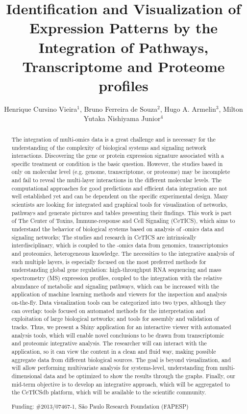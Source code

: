 \documentclass[twoside]{article}
\title{\vspace{-15mm}\fontsize{24pt}{10pt}\selectfont\textbf{Identification and Visualization of Expression Patterns by the Integration of Pathways, Transcriptome and Proteome profiles}} %
\author{Henrique Cursino Vieira$^1$, Bruno Ferreira de Souza$^2$, Hugo A. Armelin$^3$, Milton Yutaka Nishiyama Junior$^4$}
\affil{1 LECC-CETICS, INSTITUTO BUTANTAN\\ 2 ECC-CETICS, INSTITUTO BUTANTAN\\ 3 INSTITUTO BUTANTAN\\ 4 LETA-CETICS, INSTITUTO BUTANTAN\\ }
\date{}
\begin{document}
\maketitle %

\thispagestyle{fancy} %


\begin{abstract}
The integration of multi-omics data is a great challenge and is necessary for the understanding of the complexity of biological systems and signaling network interactions. Discovering the gene or protein expression signature associated with a specific treatment or condition is the basic question. However, the studies based in only on molecular level (e.g. genome, transcriptome, or proteome) may be incomplete and fail to reveal the multi-layer interactions in the different molecular levels. The computational approaches for good predictions and efficient data integration are not well established yet and can be dependent on the specific experimental design. Many scientists are looking for integrated and graphical tools for visualization of networks, pathways and generate pictures and tables presenting their findings. This work is part of The Center of Toxins, Immune-response and Cell Signaling (CeTICS), which aims to understand the behavior of biological systems based on analysis of -omics data and signaling networks; The studies and research in CeTICS are intrinsically interdisciplinary, which is coupled to the -omics data from genomics, transcriptomics and proteomics, heterogeneous knowledge. 
The necessities to the integrative analysis of such multiple layers, is especially focused on the most preferred methods for understanding global gene regulation: high-throughput RNA sequencing and mass spectrometry (MS) expression profiles, coupled to the integration with the relative abundance of metabolic and signaling pathways, which can be increased with the application of machine learning methods and viewers for the inspection and analysis on-the-fly. Data visualization tools can be categorized into two types, although they can overlap: tools focused on automated methods for the interpretation and exploitation of large biological networks; and tools for assembly and validation of tracks. Thus, we present a Shiny application for an interactive viewer with automated analysis tools, which will enable novel conclusions to be drawn from transcriptomic and proteomic integrative analysis. The researcher will can interact with the application, so it can view the content in a clean and fluid way, making possible aggregate data from different biological sources. The goal is beyond visualization, and will allow performing multivariate analysis for systems-level, understanding from multi-dimensional data and be optimized to show the results through the graphs. 
Finally, our mid-term objective is to develop an integrative approach, which will be aggregated to the CeTICSdb platform, which will be available to the scientific community.

Funding: \#2013/07467-1, S\~ao Paulo Research Foundation (FAPESP)
\end{abstract}
\end{document}
